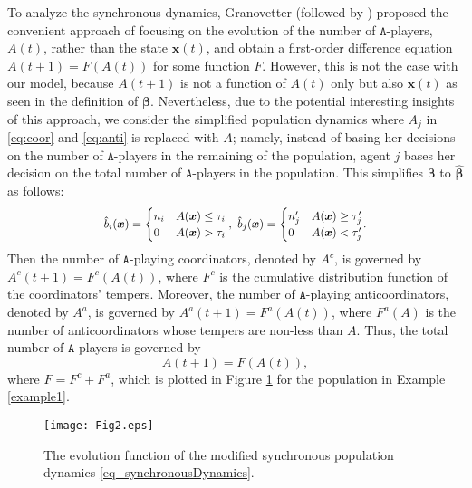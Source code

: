 \documentclass[10 pt,twocolumn,journal]{IEEEtran}
\theoremstyle{plain}
\newcommand{\A}{\mathcal{A}}
\newcommand{\x}{\bm{x}}
\renewcommand{\b}{\bm{\beta}}
\renewcommand{\A}{\mathtt{A}}
\theoremstyle{definition}
\begin{document}
To analyze the synchronous dynamics, Granovetter \cite{granovetter1978threshold} (followed by \cite{granovetter1983threshold}) proposed the convenient approach of focusing on the evolution of the number of $\A$-players, $A(t)$, rather than the state $\x(t)$, and obtain a first-order difference equation $A(t+1)=F(A(t))$ for some function $F$. 
However, this is not the case with our model, because $A(t+1)$ is not a function of $A(t)$ only but also $\x(t)$ as seen in the definition of $\b$.
Nevertheless, due to the potential interesting insights of this approach, we consider the simplified population dynamics where $A_j$ in \eqref{eq:coor} and \eqref{eq:anti} is replaced with $A$; namely, instead of basing her decisions on the number of $\A$-players in the remaining of the population, agent $j$ bases her decision on the total number of $\A$-players in the population.
This simplifies $\b$ to $\hat{\b}$ as follows:
\begin{equation*}\scalebox{.91}{\text{$
    \hat{b}_i(\x) = 
    \begin{cases}
        n_i     & A(\x)\leq \tau_i \\
        0       & A(\x) > \tau_i
    \end{cases},\
    \hat{b}_j(\x) = 
    \begin{cases}
        n'_j    & A(\x)\geq \tau'_j \\
        0       & A(\x) < \tau'_j
    \end{cases}$}.}
\end{equation*}
Then the number of $\A$-playing coordinators, denoted by $A^c$, is governed by $A^c(t+1) = F^c(A(t))$, where $F^c$ is the cumulative distribution function of the coordinators' tempers. 
Moreover, the number of $\A$-playing anticoordinators, denoted by $A^a$, is governed by $A^a(t+1) = F^a(A(t))$, where $F^a(A)$ is the number of anticoordinators whose tempers are non-less than $A$.
Thus, the total number of $\A$-players is governed by 
\begin{equation}    \label{eq_synchronousDynamics}
        A(t+1) = F(A(t)),
\end{equation}
where $F=F^c+F^a$, which is plotted in Figure \ref{Fig2} for the population in Example \ref{example1}. 
\begin{figure}[h]
	\centering	\texttt{[image: Fig2.eps]}
    \caption{The evolution function of the modified synchronous population dynamics \eqref{eq_synchronousDynamics}.}
	\label{Fig2}
\end{figure} 
\end{document}
